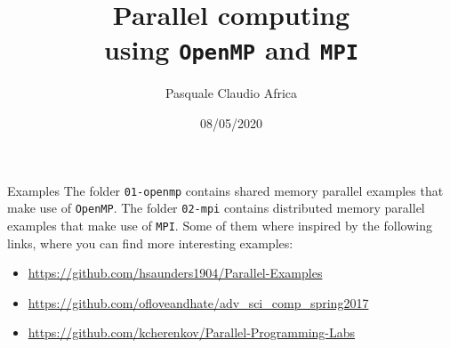 \documentclass[10pt]{beamer}
\begin{document}
    \title{Parallel computing\protect\\ using \texttt{OpenMP} and \texttt{MPI}}
    \author{Pasquale Claudio Africa}
    \date{08/05/2020}

\begin{frame}
    \maketitle
\end{frame}

\begin{frame}{Examples}
The folder \texttt{01-openmp} contains shared memory parallel examples that make use of \texttt{OpenMP}.
\vfill
The folder \texttt{02-mpi} contains distributed memory parallel examples that make use of \texttt{MPI}.
\vfill
Some of them where inspired by the following links, where you can find more interesting examples:
\begin{itemize}
    \item \url{https://github.com/hsaunders1904/Parallel-Examples}
    \item \url{https://github.com/ofloveandhate/adv_sci_comp_spring2017}
    \item \url{https://github.com/kcherenkov/Parallel-Programming-Labs}
\end{itemize}
\end{frame}
\end{document}

